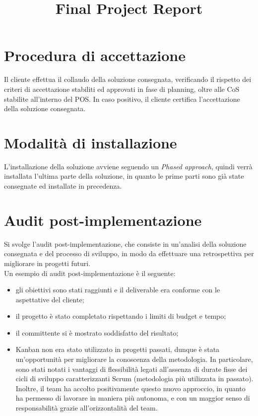 \documentclass[a4paper,12pt]{article}
\title{\textbf{Final Project Report}}
\author{}
\date{}
\begin{document}
\maketitle
\tableofcontents

\newpage

\section{Procedura di accettazione}
Il cliente effettua il collaudo della soluzione consegnata, verificando il rispetto dei criteri di accettazione
stabiliti ed approvati in fase di planning, oltre alle CoS stabilite all'interno del POS. In caso positivo, il cliente
certifica l'accettazione della soluzione consegnata.

\section{Modalità di installazione}
L'installazione della soluzione avviene seguendo un \textit{Phased approach}, quindi verrà installata l'ultima parte
della soluzione, in quanto le prime parti sono già state consegnate ed installate in precedenza.

\section{Audit post-implementazione}
Si svolge l'audit post-implementazione, che consiste in un'analisi della soluzione consegnata e del processo di
sviluppo, in modo da effettuare una retrospettiva per migliorare in progetti futuri. \\
Un esempio di audit post-implementazione è il seguente:
\begin{itemize}
    \item gli obiettivi sono stati raggiunti e il deliverable era conforme con le aspettative del cliente;
    \item il progetto è stato completato rispettando i limiti di budget e tempo;
    \item il committente si è mostrato soddisfatto del risultato;
    \item Kanban non era stato utilizzato in progetti passati, dunque è stata un'opportunità per migliorare la
    conoscenza della metodologia. In particolare, sono stati notati i vantaggi di flessibilità legati all'assenza di
    durate fisse dei cicli di sviluppo caratterizzanti Scrum (metodologia più utilizzata in passato). Inoltre, il team
    ha accolto positivamente questo nuovo approccio, in quanto ha permesso di lavorare in maniera più autonoma, e con
    un maggior senso di responsabilità grazie all'orizzontalità del team.
\end{itemize}
\end{document}
